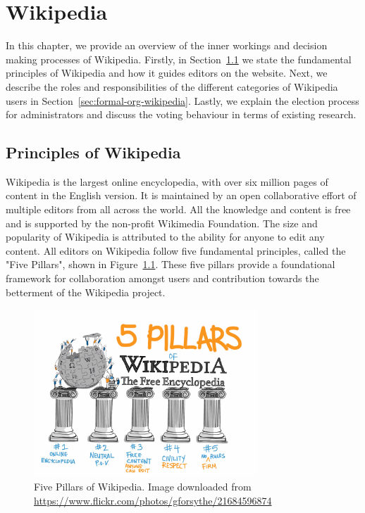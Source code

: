 \chapter{Wikipedia}
\label{chp:wikipedia}
In this chapter, we provide an overview of the inner workings and decision making processes of Wikipedia.
Firstly, in Section~\ref{sec:principles-wikipedia} we state the fundamental principles of Wikipedia and how it guides editors on the website.
Next, we describe the roles and responsibilities of the  different categories of Wikipedia users in Section~\ref{sec:formal-org-wikipedia}.
Lastly, we explain the election process for administrators and discuss the voting behaviour in terms of existing research. 

\section{Principles of Wikipedia}
\label{sec:principles-wikipedia}
Wikipedia is the largest online encyclopedia, with over six million pages of content in the English version.
It is maintained by an open collaborative effort of multiple editors from all across the world.
All the knowledge and content is free and is supported by the non-profit Wikimedia Foundation.
The size and popularity of Wikipedia is attributed to the ability for anyone to edit any content.
All editors on Wikipedia follow five fundamental principles, called the "Five Pillars", shown in Figure~\ref{fig:5-pillars}. 
These five pillars provide a foundational framework for collaboration amongst users and contribution towards the betterment of the Wikipedia project.  
\begin{figure}[!ht]
    \centering
    \includegraphics[width=0.75\textwidth]{images/Pillars.jpg}
    \caption{Five Pillars of Wikipedia. Image downloaded from \url{https://www.flickr.com/photos/gforsythe/21684596874}}
    \label{fig:5-pillars}   
\end{figure}

